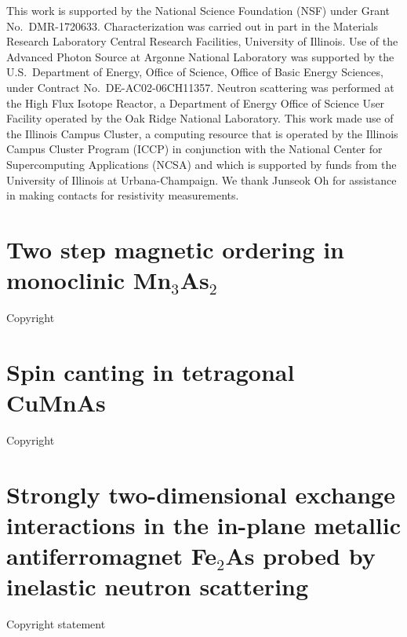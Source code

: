 \documentclass[10pt,doublespacing,edeposit]{uiucthesis2020}
\begin{document}
\begin{mainmatter}
This work is supported by the National Science Foundation
(NSF) under Grant No.\ DMR-1720633.
Characterization was carried out in part in the Materials Research Laboratory Central Research Facilities, University of Illinois. Use of the Advanced Photon Source at Argonne National Laboratory was supported by the U.S.\ Department of Energy, Office of Science, Office of Basic Energy Sciences, under Contract No.\ DE-AC02-06CH11357. Neutron scattering was performed at the High Flux Isotope Reactor, a Department of Energy Office of Science User Facility operated by the Oak Ridge National Laboratory.
This work made use of the Illinois Campus Cluster, a computing resource that is operated by the Illinois Campus Cluster Program (ICCP) in conjunction with the National Center for Supercomputing Applications (NCSA) and which is supported by funds from the University of Illinois at Urbana-Champaign.
We thank Junseok Oh for assistance in making contacts for resistivity measurements.

\chapter{Two step magnetic ordering in monoclinic Mn$_3$As$_2$}

Copyright



\chapter{Spin canting in tetragonal CuMnAs}

Copyright



\chapter{Strongly two-dimensional exchange interactions in the in-plane metallic antiferromagnet Fe$_2$As probed by inelastic neutron scattering}

Copyright statement

\iffalse

\begin{abstract}


\end{abstract}
\end{mainmatter}
\end{document}
